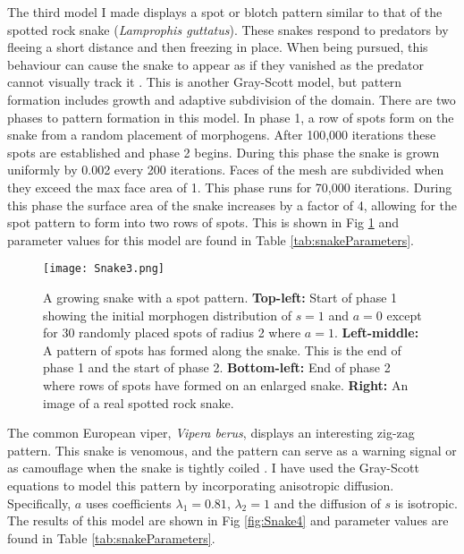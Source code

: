 The third model I made displays a spot or blotch pattern similar to that of the spotted rock snake (\textit{Lamprophis guttatus}). These snakes respond to predators by fleeing a short distance and then freezing in place. When being pursued, this behaviour can cause the snake to appear as if they vanished as the predator cannot visually track it \citet{lillywhite2014}. This is another Gray-Scott model, but pattern formation includes growth and adaptive subdivision of the domain. There are two phases to pattern formation in this model. In phase 1, a row of spots form on the snake from a random placement of morphogens. After 100,000 iterations these spots are established and phase 2 begins. During this phase the snake is grown uniformly by 0.002 every 200 iterations. Faces of the mesh are subdivided when they exceed the max face area of 1. This phase runs for 70,000 iterations. During this phase the surface area of the snake increases by a factor of 4, allowing for the spot pattern to form into two rows of spots. This is shown in Fig \ref{fig:Snake3} and parameter values for this model are found in Table \ref{tab:snakeParameters}.

\begin{figure}[ht]
	\centering
	\texttt{[image: Snake3.png]}
	\caption{A growing snake with a spot pattern. \textbf{Top-left:} Start of phase 1 showing the initial morphogen distribution of $s=1$ and $a=0$ except for 30 randomly placed spots of radius 2 where $a=1$. \textbf{Left-middle:} A pattern of spots has formed along the snake. This is the end of phase 1 and the start of phase 2. \textbf{Bottom-left:} End of phase 2 where rows of spots have formed on an enlarged snake. \textbf{Right:} An image of a real spotted rock snake.}
	\label{fig:Snake3}
\end{figure}

The common European viper, \textit{Vipera berus}, displays an interesting zig-zag pattern. This snake is venomous,   and the pattern can serve as a warning signal or as camouflage when the snake is tightly coiled \cite{lillywhite2014}. I have used the Gray-Scott equations to model this pattern by incorporating anisotropic diffusion. Specifically, $a$ uses coefficients $\lambda_{1}=0.81$, $\lambda_{2}=1$ and the diffusion of $s$ is isotropic. The results of this model are shown in Fig \ref{fig:Snake4} and parameter values are found in Table \ref{tab:snakeParameters}.

\newpage 

